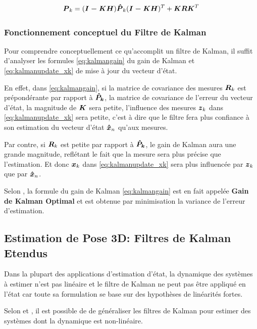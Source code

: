 \documentclass[12pt,a4paper]{report}
\begin{document}
	\begin{equation}
	\label{eq:kalmanupdate_pk}
	\boldsymbol{P}_k = (\boldsymbol{I-KH})\boldsymbol{\hat{P}}_k(\boldsymbol{I-KH})^T + \boldsymbol{KRK}^T
	\end{equation}


	\subsubsection{Fonctionnement conceptuel du Filtre de Kalman}
	Pour comprendre conceptuellement ce qu'accomplit un filtre de Kalman, il suffit d'analyser les formules \ref{eq:kalmangain} du gain de Kalman et \ref{eq:kalmanupdate_xk} de mise à jour du vecteur d'état.
	
	\para En effet, dans \ref{eq:kalmangain}, si la matrice de covariance des mesures $\boldsymbol{R}_k$ est prépondérante par rapport à $\boldsymbol{\hat{P}_k}$, la matrice de covariance de l'erreur du vecteur d'état, la magnitude de $\boldsymbol{K}$ sera petite, l'influence des mesures $\boldsymbol{z}_k$ dans \ref{eq:kalmanupdate_xk} sera petite, c'est à dire que le filtre fera plus confiance à son estimation du vecteur d'état $\boldsymbol{\hat{x}}_n$ qu'aux mesures.
	
	\para Par contre, si $\boldsymbol{R}_k$ est petite par rapport à $\boldsymbol{\hat{P}_k}$, le gain de Kalman aura une grande magnitude, reflétant le fait que la mesure sera plus précise que l'estimation. Et donc $\boldsymbol{x}_k$ dans \ref{eq:kalmanupdate_xk} sera plus influencée par $\boldsymbol{z}_k$ que par $\boldsymbol{\hat{x}}_n$.
	
	\para Selon \cite{zarchan_fundamentals_2009}, la formule du gain de Kalman \ref{eq:kalmangain} est en fait appelée \textbf{Gain de Kalman Optimal} et est obtenue par minimisation la variance de l'erreur d'estimation.
	
	
	\subsection{Estimation de Pose 3D: Filtres de Kalman Etendus}
	
	Dans la plupart des applications d'estimation d'état, la dynamique des systèmes à estimer n'est pas linéaire et le filtre de Kalman ne peut pas être appliqué en l'état car toute sa formulation se base sur des hypothèses de linéarités fortes.
	
	\para Selon \cite{menegatti_generalized_2016} et \cite{zarchan_fundamentals_2009}, il est possible de de généraliser les filtres de Kalman pour estimer des systèmes dont la dynamique est non-linéaire.
	
\end{document}
